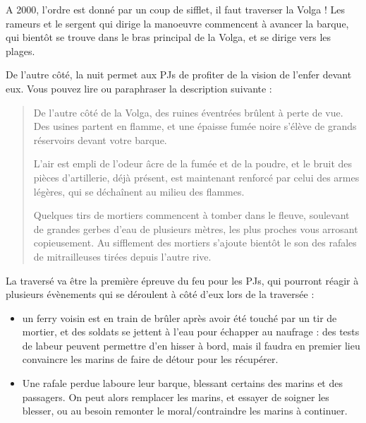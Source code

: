 \documentclass{report}
\begin{document}
\begin{multicols}{2}

A 2000, l'ordre est donné par un coup de sifflet, il faut traverser la Volga ! Les rameurs et le sergent qui dirige la manoeuvre commencent à avancer la barque, qui bientôt se trouve dans le bras principal de la Volga, et se dirige vers les plages.

De l'autre côté, la nuit permet aux PJs de profiter de la vision de l'enfer devant eux. Vous pouvez lire ou paraphraser la description suivante :
\begin{quotation}
De l'autre côté de la Volga, des ruines éventrées brûlent à perte de vue. Des usines partent en flamme, et une épaisse fumée noire s'élève de grands réservoirs devant votre barque.

L'air est empli de l'odeur âcre de la fumée et de la poudre, et le bruit des pièces d'artillerie, déjà présent, est maintenant renforcé par celui des armes légères, qui se déchaînent au milieu des flammes.

Quelques tirs de mortiers commencent à tomber dans le fleuve, soulevant de grandes gerbes d'eau de plusieurs mètres, les plus proches vous arrosant copieusement. Au sifflement des mortiers s'ajoute bientôt le son des rafales de mitrailleuses tirées depuis l'autre rive.
\end{quotation}
La traversé va être la première épreuve du feu pour les PJs, qui pourront réagir à plusieurs évènements qui se déroulent à côté d'eux lors de la traversée :
\begin{itemize}
    \item un ferry voisin est en train de brûler après avoir été touché par un tir de mortier, et des soldats se jettent à l'eau pour échapper au naufrage : des tests de labeur peuvent permettre d'en hisser à bord, mais il faudra en premier lieu convaincre les marins de faire de détour pour les récupérer.
    \item Une rafale perdue laboure leur barque, blessant certains des marins et des passagers. On peut alors remplacer les marins, et essayer de soigner les blesser, ou au besoin remonter le moral/contraindre les marins à continuer.
\end{itemize}


\end{multicols}
\end{document}
